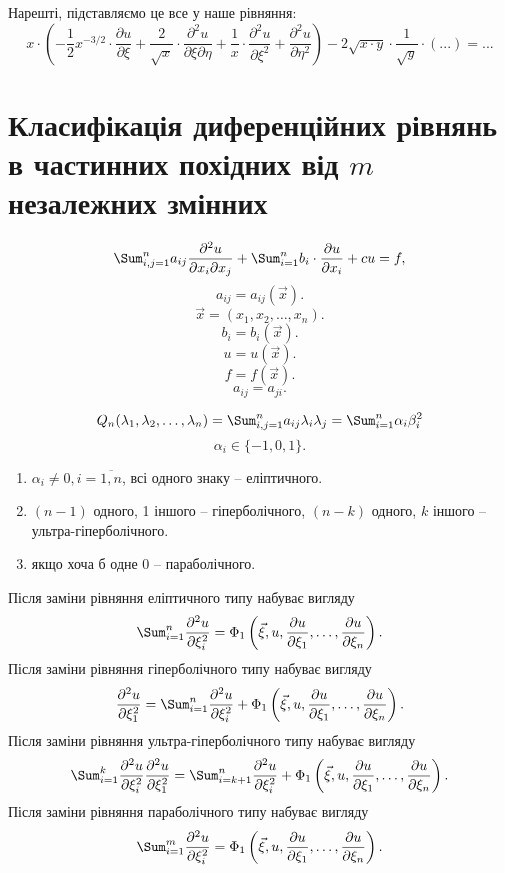 Нарешті, підставляємо це все у наше рівняння:
\[ x \cdot \left( - \dfrac 1 2 x^{-3/2} \cdot \dfrac{\partial u}{\partial \xi} + \dfrac{2}{\sqrt{x}} \cdot \dfrac{\partial^2 u}{\partial \xi \partial \eta} + \dfrac 1 x \cdot \dfrac{\partial^2 u}{\partial \xi^2} + \dfrac{\partial^2 u}{\partial \eta^2}\right) - 2 \sqrt{x \cdot y} \cdot \dfrac 1 {\sqrt{y}} \cdot \left( ... \right) = ... \]


\section{Класифікація диференційних рівнянь в частинних похідних від $m$ незалежних змінних }

\[ \Sum_{i, j = 1}^n a_{ij} \dfrac{\partial^2 u}{\partial x_i \partial x_j} + \Sum_{i = 1}^n b_i \cdot \dfrac{\partial u}{\partial x_i} + c u = f, \]
\[ a_{ij} = a_{ij}(\vec x). \]
\[ \vec x = (x_1, x_2, \ldots, x_n). \]
\[ b_i = b_i(\vec x). \]
\[ u = u(\vec x). \]
\[ f = f(\vec x). \]
\[ a_{ij} = a_{ji}. \]

\[ Q_n(\lambda_1, \lambda_2, \ldots, \lambda_n) = \Sum_{i,j=1}^n a_{ij}\lambda_i\lambda_j = \Sum_{i = 1}^n \alpha_i \beta_i^2 \]
\[ \alpha_i \in \{ -1, 0, 1\}. \]

\begin{enumerate}
	\item $\alpha_i \ne 0, i = \overline{1, n}$, всі одного знаку -- еліптичного.
	\item $(n - 1)$ одного, 1 іншого -- гіперболічного, $(n - k)$ одного, $k$ іншого -- ультра-гіперболічного.
	\item якщо хоча б одне 0 -- параболічного.
\end{enumerate}

Після заміни рівняння еліптичного типу набуває вигляду
\[ \Sum_{i=1}^n \dfrac{\partial^2 u}{\partial \xi_i^2} = \Phi_1 \left(\vec \xi, u, \dfrac{\partial u}{\partial \xi_1}, \ldots, \dfrac{\partial u}{\partial \xi_n} \right). \]
Після заміни рівняння гіперболічного типу набуває вигляду
\[ \dfrac{\partial^2 u}{\partial \xi_1^2} = \Sum_{i=1}^n \dfrac{\partial^2 u}{\partial \xi_i^2} + \Phi_1 \left(\vec \xi, u, \dfrac{\partial u}{\partial \xi_1}, \ldots, \dfrac{\partial u}{\partial \xi_n} \right). \]
Після заміни рівняння ультра-гіперболічного типу набуває вигляду
\[ \Sum_{i=1}^k \dfrac{\partial^2 u}{\partial \xi_i^2} \dfrac{\partial^2 u}{\partial \xi_1^2} = \Sum_{i=k+1}^n \dfrac{\partial^2 u}{\partial \xi_i^2} + \Phi_1 \left(\vec \xi, u, \dfrac{\partial u}{\partial \xi_1}, \ldots, \dfrac{\partial u}{\partial \xi_n} \right). \]
Після заміни рівняння параболічного типу набуває вигляду
\[ \Sum_{i=1}^m \dfrac{\partial^2 u}{\partial \xi_i^2} = \Phi_1 \left(\vec \xi, u, \dfrac{\partial u}{\partial \xi_1}, \ldots, \dfrac{\partial u}{\partial \xi_n} \right). \]


